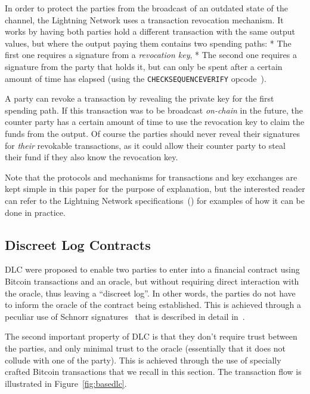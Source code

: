In order to protect the parties from the broadcast of an outdated state of the channel, the Lightning Network uses a transaction revocation mechanism.
It works by having both parties hold a different transaction with the same output values, but where the output paying them contains two spending paths:
* The first one requires a signature from a \emph{revocation key},
* The second one requires a signature from the party that holds it, but can only be spent after a certain amount of time has elapsed (using the \Verb_CHECKSEQUENCEVERIFY_ opcode~\cite{csv}).

A party can revoke a transaction by revealing the private key for the first spending path.
If this transaction was to be broadcast \emph{on-chain} in the future, the counter party has a certain amount of time to use the revocation key to claim the funds from the output.
Of course the parties should never reveal their signatures for \emph{their} revokable transactions, as it could allow their counter party to steal their fund if they also know the revocation key.

Note that the protocols and mechanisms for transactions and key exchanges are kept simple in this paper for the purpose of explanation, but the interested reader can refer to the Lightning Network specifications~(\cite{bolt2, bolt3}) for examples of how it can be done in practice.

\subsection{Discreet Log Contracts}\label{basedlc}
DLC were proposed to enable two parties to enter into a financial contract using Bitcoin transactions and an oracle, but without requiring direct interaction with the oracle, thus leaving a “discreet log”.
In other words, the parties do not have to inform the oracle of the contract being established.
This is achieved through a peculiar use of Schnorr signatures~\cite{schnorr1989efficient} that is described in detail in~\cite{dryja2017discreet}.

The second important property of DLC is that they don’t require trust between the parties, and only minimal trust to the oracle (essentially that it does not collude with one of the party).
This is achieved through the use of specially crafted Bitcoin transactions that we recall in this section.
The transaction flow is illustrated in Figure~\ref{fig:basedlc}.

